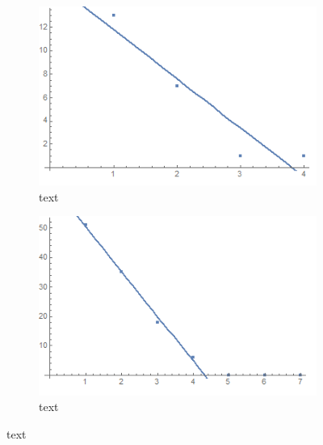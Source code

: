 \documentclass[main.tex]{subfiles}
\begin{document}
        \begin{figure}[h!]
          \begin{subfigure}{0.5\linewidth}
            \centering
            \includegraphics[width=0.9\linewidth]{figures/trainingGraph}
            \caption{text}
            \label{fig:training}
          \end{subfigure}
          \begin{subfigure}{0.5\linewidth}
            \centering
            \includegraphics[width=0.9\linewidth]{figures/testGraph}
            \caption{text}
            \label{fig:test}
          \end{subfigure}
          \caption{text}
          \label{fig:analysis}
        \end{figure}
      
\end{document}
